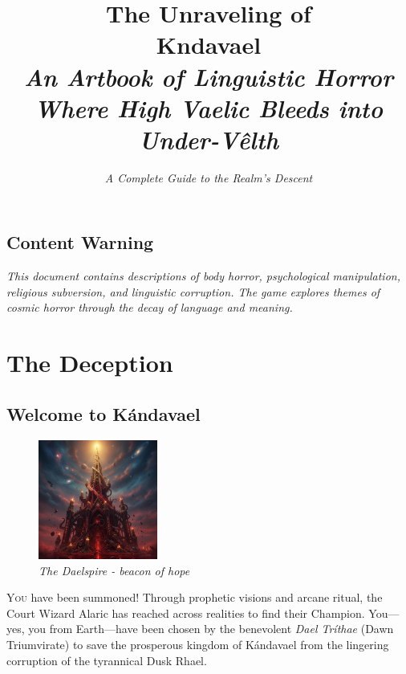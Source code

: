 \documentclass[11pt,a4paper,twoside]{book}
\title{
    \displayfont\Huge
    The Unraveling of\\
    \vspace{0.5em}
    {\Huge K}\corrupt{á}{â}ndavael\\
    \vspace{1em}
    \large\textit{An Artbook of Linguistic Horror}\\
    \vspace{0.5em}
    \normalsize\textit{Where High Vaelic Bleeds into Under-Vêlth}
}
\author{
    \textit{A Complete Guide to the Realm's Descent}
}
\date{}
\begin{document}
\frontmatter
\maketitle

\chapter*{Content Warning}
\begin{adjustwidth}{2em}{2em}
\textit{This document contains descriptions of body horror, psychological manipulation, religious subversion, and linguistic corruption. The game explores themes of cosmic horror through the decay of language and meaning.}
\end{adjustwidth}

\tableofcontents

\mainmatter

\part{The Deception}

\chapter{Welcome to Kándavael}

\begin{figure}
    \centering
    \includegraphics[width=0.35\textwidth]{images/daelspire_transformation_2025-09-03T22-21-48-135Z_1.png}
    \caption*{\small\textit{The Daelspire - beacon of hope}}
\end{figure}

\lettrine[lines=4]{\color{dawn}Y}{ou} have been summoned! Through prophetic visions and arcane ritual, the Court Wizard Alaric has reached across realities to find their Champion. You—yes, you from Earth—have been chosen by the benevolent \textit{Dael Tríthae} (Dawn Triumvirate) to save the prosperous kingdom of Kándavael from the lingering corruption of the tyrannical Dusk Rhael.
\end{document}
